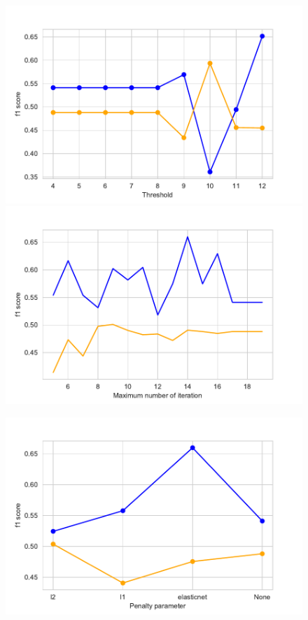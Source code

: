 \documentclass[11pt]{article}
\begin{document}
%
\begin{figure}[h]
\begin{minipage}[l]{0.33\textwidth}
\includegraphics[width=1\linewidth]{bridges/thresholds_ppn.pdf}
\end{minipage}
\begin{minipage}[l]{0.33\textwidth}
\includegraphics[width=1\linewidth]{bridges/max_iter_ppn.pdf}
\end{minipage}
\begin{minipage}[l]{0.33\textwidth}
\includegraphics[width=1\linewidth]{bridges/penalty_ppn.pdf}\\

\end{minipage}
\end{figure}
\end{document}
